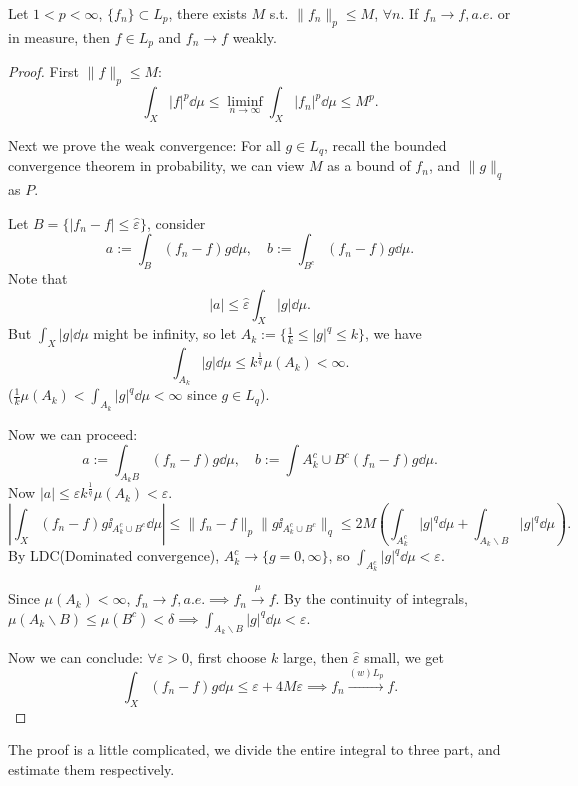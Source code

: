 \begin{theorem}
    Let $1<p<\infty$, $\{f_n\}\subset L_p$, there exists $M$ s.t.
	$ \lVert f_n \rVert _p \le M$, $\forall n$.
	If $f_n \to f, a.e.$ or in measure, then $f\in L_p$
	and $f_n \to f$ weakly.
\end{theorem}
\begin{proof}[Proof]
    First $ \lVert f \rVert _p \le M$:
	\[
	\int_X |f|^p\dd \mu\le \liminf_{n\to \infty}\int_X |f_n|^p\dd\mu \le M^p.
	\]

	Next we prove the weak convergence:
	For all $g\in L_q$, recall the bounded convergence theorem in probability,
	we can view  $M$ as a bound of $f_n$, and $ \lVert g \rVert _q$	as $P$.

	Let $B = \{|f_n - f|\le \hat{\varepsilon}\}$, consider
	\[
	a := \int_B (f_n - f)g \dd\mu, \quad
	b:= \int_{B^c}(f_n - f)g\dd \mu.
	\]
	Note that
	\[
	|a| \le \hat{\varepsilon}\int_X |g|\dd \mu.
	\]
	But $\int_X |g|\dd \mu$ might be infinity, so
	let $A_k := \{\frac{1}{k}\le |g|^q \le k\}$, we have
	\[
	\int_{A_k}|g|\dd \mu \le k^{\frac{1}{q}}\mu(A_k) < \infty.
	\]
	($\frac{1}{k}\mu(A_k) < \int_{A_k} |g|^q\dd \mu < \infty$ since $g\in L_q$).

	Now we can proceed:
	\[
	a:= \int_{A_kB} (f_n - f)g\dd\mu,\quad
	b:= \int{A_k^c\cup B^c} (f_n - f)g\dd \mu.
	\]
	Now $|a| \le \hat{\varepsilon} k^{\frac{1}{q}}\mu(A_k) < \varepsilon$.
	\[
	\left| \int_X (f_n - f)g \ii_{A_k^c\cup B^c}\dd \mu \right|
	\le \lVert f_n-f \rVert _p \lVert g\ii_{A_k^c\cup B^c} \rVert _q
	\le 2M \left( \int_{A_k^c}|g|^q\dd \mu +
	\int_{A_k\backslash B}|g|^q\dd\mu \right).
	\]
	By LDC(Dominated convergence), $A_k^c \to \{g = 0, \infty\}$,
	so $\int_{A_k^c} |g|^q\dd \mu < \varepsilon$.

	Since $\mu(A_k) < \infty$, $f_n \to f, a.e.\implies f_n\xrightarrow{\mu} f$.
	By the continuity of integrals, $\mu(A_k \backslash B) \le \mu(B^c)
	< \delta\implies \int_{A_k \backslash B} |g|^q \dd\mu < \varepsilon$.

	Now we can conclude: $\forall \varepsilon>0$,
	first choose $k$ large, then $\hat{\varepsilon}$ small, we get
	\[
	\int_X (f_n - f)g\dd \mu \le \varepsilon + 4M \varepsilon \implies
	f_n \xrightarrow{(w)L_p} f.
	\]
\end{proof}
\begin{remark}
    The proof is a little complicated, we divide the entire integral to
	three part, and estimate them respectively.
\end{remark}

